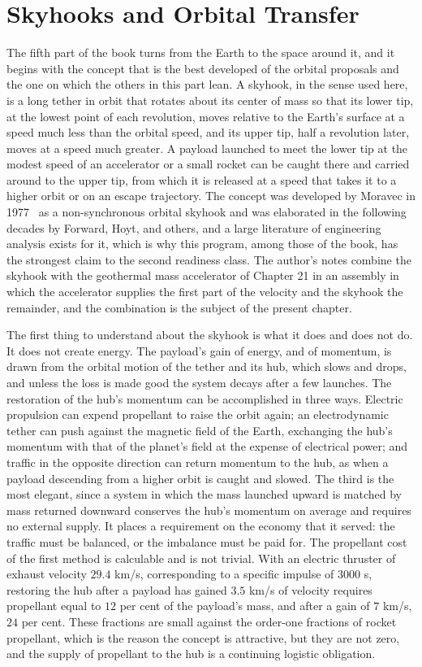 \chapter{Skyhooks and Orbital Transfer}
\label{ch:23}

The fifth part of the book turns from the Earth to the space around it, and it begins with the concept that is the best developed of the orbital proposals and the one on which the others in this part lean. A skyhook, in the sense used here, is a long tether in orbit that rotates about its center of mass so that its lower tip, at the lowest point of each revolution, moves relative to the Earth's surface at a speed much less than the orbital speed, and its upper tip, half a revolution later, moves at a speed much greater. A payload launched to meet the lower tip at the modest speed of an accelerator or a small rocket can be caught there and carried around to the upper tip, from which it is released at a speed that takes it to a higher orbit or on an escape trajectory. The concept was developed by Moravec in 1977~\cite{moravec1977} as a non-synchronous orbital skyhook and was elaborated in the following decades by Forward, Hoyt, and others, and a large literature of engineering analysis exists for it, which is why this program, among those of the book, has the strongest claim to the second readiness class. The author's notes combine the skyhook with the geothermal mass accelerator of Chapter 21 in an assembly in which the accelerator supplies the first part of the velocity and the skyhook the remainder, and the combination is the subject of the present chapter.

The first thing to understand about the skyhook is what it does and does not do. It does not create energy. The payload's gain of energy, and of momentum, is drawn from the orbital motion of the tether and its hub, which slows and drops, and unless the loss is made good the system decays after a few launches. The restoration of the hub's momentum can be accomplished in three ways. Electric propulsion can expend propellant to raise the orbit again; an electrodynamic tether can push against the magnetic field of the Earth, exchanging the hub's momentum with that of the planet's field at the expense of electrical power; and traffic in the opposite direction can return momentum to the hub, as when a payload descending from a higher orbit is caught and slowed. The third is the most elegant, since a system in which the mass launched upward is matched by mass returned downward conserves the hub's momentum on average and requires no external supply. It places a requirement on the economy that it served: the traffic must be balanced, or the imbalance must be paid for. The propellant cost of the first method is calculable and is not trivial. With an electric thruster of exhaust velocity $29.4$ km/s, corresponding to a specific impulse of $3000$ s, restoring the hub after a payload has gained $3.5$ km/s of velocity requires propellant equal to $12$ per cent of the payload's mass, and after a gain of $7$ km/s, $24$ per cent. These fractions are small against the order-one fractions of rocket propellant, which is the reason the concept is attractive, but they are not zero, and the supply of propellant to the hub is a continuing logistic obligation.

